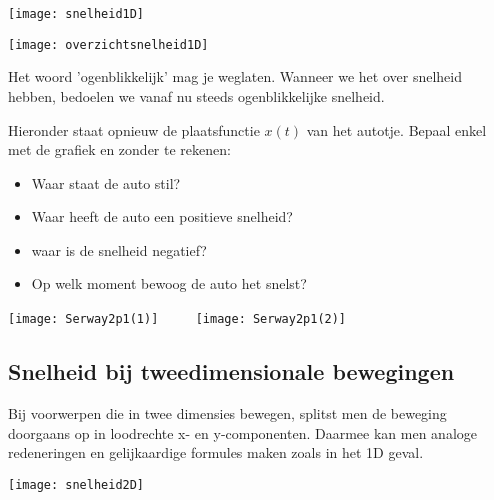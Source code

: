 \documentclass{ximera}
\begin{document}
\begin{image}
\texttt{[image: snelheid1D]}

\end{image}

\begin{image}
\texttt{[image: overzichtsnelheid1D]}

\end{image}

\begin{remark}
	Het woord 'ogenblikkelijk' mag je weglaten. Wanneer we het over snelheid hebben, bedoelen we vanaf nu steeds ogenblikkelijke snelheid.
\end{remark}



\begin{exercise}
Hieronder staat opnieuw de plaatsfunctie \(x(t)\) van het autotje. Bepaal enkel met de grafiek en zonder te rekenen: 
\begin{itemize}
	\item Waar staat de auto stil? 
	\item Waar heeft de auto een positieve snelheid?
	\item waar is de snelheid negatief? 
	\item Op welk moment bewoog de auto het snelst? 
\end{itemize}

\begin{image}
	\texttt{[image: Serway2p1(1)]}
	$\qquad$   %
	\texttt{[image: Serway2p1(2)]}
	\end{image}
	
\end{exercise}

\subsection*{Snelheid bij tweedimensionale bewegingen}

Bij voorwerpen die in twee dimensies bewegen, splitst men de beweging doorgaans op in loodrechte x- en y-componenten. Daarmee kan men analoge redeneringen en gelijkaardige formules maken zoals in het 1D geval.

\begin{image}
\texttt{[image: snelheid2D]}

\end{image}

	
\end{document}
